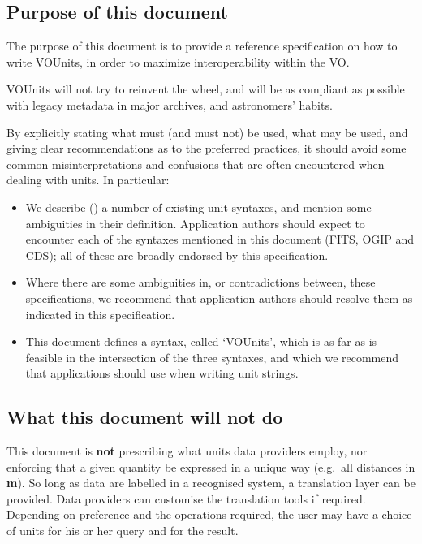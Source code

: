 \documentclass[11pt,notitlepage,onecolumn]{ivoa}
\def\eg{e.g.~}
\newcommand{\unit}[1]{\textbf{\textsf{\color{orange}#1}}}
\begin{document}
\subsection{Purpose of this document}
\label{sec:purpose}

The purpose of this document is to provide a reference specification on how
to write VOUnits, in order to maximize interoperability within the VO. 

VOUnits will not try to reinvent the wheel, and will be as compliant as possible with
legacy metadata in major archives, and astronomers' habits.

By explicitly stating what must (and must not) be used, what may be used, and
giving clear recommendations as to the preferred practices, it should avoid some
common misinterpretations and confusions that are often encountered when dealing with
units.
In particular:
\begin{itemize}
\item We describe () a number of existing unit
  syntaxes, and mention some ambiguities in their
  definition. Application authors should expect to encounter each of
  the syntaxes mentioned in this document (FITS, OGIP and CDS); all of
  these are broadly endorsed by this specification.
\item Where there are some ambiguities in, or contradictions between,
  these specifications, we recommend that application authors should
  resolve them as indicated in this specification.  
\item This document defines a syntax, called `VOUnits', which is as
  far as is feasible in the intersection of the three syntaxes, and
  which we recommend that applications should use when writing unit strings.
\end{itemize}




\subsection {What this document will not do}
\label{sec:outofscope}

This document is \textbf{not} prescribing what units data providers
employ, nor enforcing that a given quantity be expressed in a
unique way (\eg all distances in \unit{m}).  So long as data are labelled 
in a recognised system, a
translation layer can be provided. Data providers can customise the
translation tools if required. Depending on preference and the
operations required, the user may have a choice of units for his or her
query and for the result.
\end{document}
